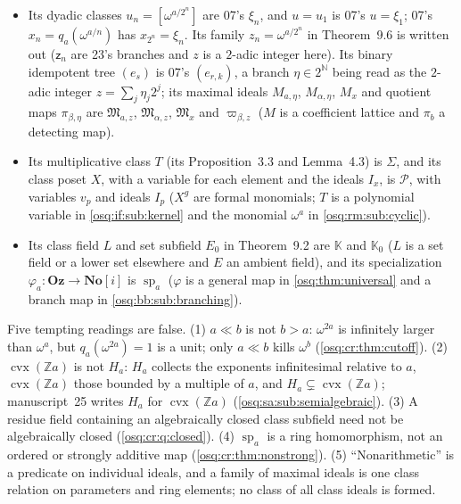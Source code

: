 \documentclass[11pt,letterpaper]{article}
\numberwithin{equation}{section}
\theoremstyle{definition}
\theoremstyle{remark}
\theoremstyle{plain}
\newcommand{\No}{\mathbf{No}}
\newcommand{\Oz}{\mathbf{Oz}}
\newcommand{\SC}{\No[i]}
\newcommand{\Z}{\mathbb Z}
\newcommand{\N}{\mathbb N}
\newcommand{\FF}{\mathscr F}         %
\begin{document}
\begin{itemize}
$\No\hookrightarrow\FF_a$ of \eqref{osq:if:eq:Theta}, a different map.
\item Its dyadic classes $u_n=[\omega^{a/2^n}]$ are 07's $\xi_n$, and $u=u_1$ is 07's $u=\xi_1$; 07's $x_n=q_a(\omega^{a/n})$ has $x_{2^n}=\xi_n$. Its
family $z_n=\omega^{a/2^n}$ in Theorem~9.6 is written out ($\mathsf z_n$ are 23's branches and $z$ is a $2$-adic integer here). Its
binary idempotent tree $(e_s)$ is 07's $(e_{r,k})$, a branch $\eta\in2^{\N}$ being read as the $2$-adic integer $z=\sum_j\eta_j2^j$; its maximal ideals
$M_{a,\eta}$, $M_{\alpha,\eta}$, $M_x$ and quotient maps $\pi_{\beta,\eta}$ are $\mathfrak M_{a,z}$, $\mathfrak M_{\alpha,z}$, $\mathfrak M_x$ and
$\varpi_{\beta,z}$ ($M$ is a coefficient lattice and $\pi_b$ a detecting map).
\item Its multiplicative class $T$ (its Proposition~3.3 and Lemma~4.3) is $\Sigma$, and its class poset $X$, with a variable for each element and
the ideals $I_x$, is $\mathcal P$, with variables $v_p$ and ideals $I_p$ ($X^g$ are formal monomials; $T$ is a polynomial variable in
\cref{osq:if:sub:kernel} and the monomial $\omega^a$ in \cref{osq:rm:sub:cyclic}).
\item Its class field $L$ and set subfield $E_0$ in Theorem~9.2 are $\mathbb K$ and $\mathbb K_0$ ($L$ is a set field or a lower set elsewhere and $E$ an
ambient field), and its specialization $\varphi_a:\Oz\to\SC$ is $\operatorname{sp}_a$ ($\varphi$ is a general map in \cref{osq:thm:universal} and a
branch map in \cref{osq:bb:sub:branching}).
\end{itemize}
Five tempting readings are false. (1) $a\ll b$ is not $b>a$: $\omega^{2a}$ is infinitely larger than $\omega^a$, but $q_a(\omega^{2a})=1$ is a unit;
only $a\ll b$ kills $\omega^b$ (\cref{osq:cr:thm:cutoff}). (2) $\operatorname{cvx}(\Z a)$ is not $H_a$: $H_a$ collects the exponents infinitesimal
relative to $a$, $\operatorname{cvx}(\Z a)$ those bounded by a multiple of $a$, and $H_a\subsetneq\operatorname{cvx}(\Z a)$; manuscript~25 writes $H_a$ for
$\operatorname{cvx}(\Z a)$ (\cref{osq:sa:sub:semialgebraic}). (3) A residue field containing an algebraically closed class subfield need not be
algebraically closed (\cref{osq:cr:q:closed}). (4) $\operatorname{sp}_a$ is a ring homomorphism, not an ordered or strongly additive map
(\cref{osq:cr:thm:nonstrong}). (5) ``Nonarithmetic'' is a predicate on individual ideals, and a family of maximal ideals is one class relation on
parameters and ring elements; no class of all class ideals is formed.
\end{document}
